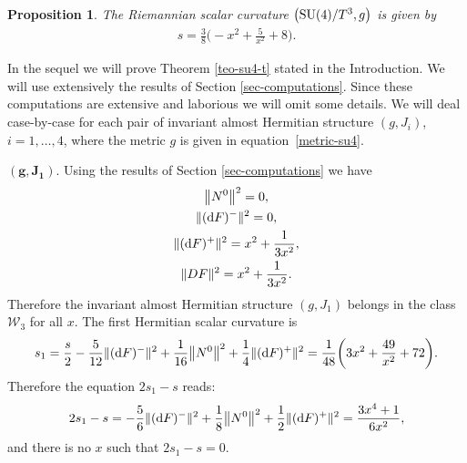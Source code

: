 \documentclass[10pt,a4paper]{amsart}
\numberwithin{equation}{section}
\newtheorem{Proposition}[Theorem]{Proposition}
 { \theoremstyle{definition}
\newtheorem{Definition}[Theorem]{Definition}
\newtheorem{Question}[Theorem]{Question}
\newtheorem*{Notation}{Notation}
\newtheorem{Example}[Theorem]{Example}
\newtheorem{Remark}[Theorem]{Remark} }
\begin{document}
\begin{Proposition}
The Riemannian scalar curvature $\big({\rm SU}(4)/T^3,g\big)$ is given by
\begin{gather*}
s=\frac{3}{8} \bigg({-}x^2+\frac{5}{x^2}+8\bigg).
\end{gather*}
\end{Proposition}

In the sequel we will prove Theorem \ref{teo-su4-t} stated in the Introduction. We will use extensively the results of Section \ref{sec-computations}. Since these computations are extensive and laborious we will omit some details. We will deal case-by-case for each pair of invariant almost Hermitian structure $(g,J_i)$, $i=1,\ldots, 4$, where the metric $g$ is given in equation~\eqref{metric-su4}.

\medskip\noindent
$\boldsymbol{(g, J_{1}).}$ Using the results of Section \ref{sec-computations} we have
\begin{gather*}
\big\|N^{0}\big\|^{2}=0,\\
\|({\rm d}F)^{-}\|^{2}=0,\\
\|({\rm d}F)^{+}\|^{2}=x^2+\frac{1}{3 x^2},\\
\|DF\|^{2}=x^2+\frac{1}{3 x^2}.
\end{gather*}
Therefore the invariant almost Hermitian structure $(g,J_1)$ belongs in the class $\mathcal{W}_{3}$ for all $x$.
The first Hermitian scalar curvature is
\begin{align*}
s_{1}=\dfrac{s}{2}-\dfrac{5}{12}\|({\rm d}F)^{-}\|^{2}+\dfrac{1}{16}\big\|N^{0}\big\|^{2}+\dfrac{1}{4}\|({\rm d}F)^{+}\|^{2}
=\frac{1}{48} \bigg(3 x^2+\frac{49}{x^2}+72\bigg).
\end{align*}
Therefore the equation $2s_{1}-s$ reads:
\begin{align*}
2s_{1}-s=-\dfrac{5}{6}\|({\rm d}F)^{-}\|^{2}+\dfrac{1}{8}\big\|N^{0}\big\|^{2}+\dfrac{1}{2}\|({\rm d}F)^{+}\|^{2}
=\frac{3 x^4+1}{6 x^2},
\end{align*}
and there is no $x$ such that $2s_{1}-s=0$.
\end{document}
